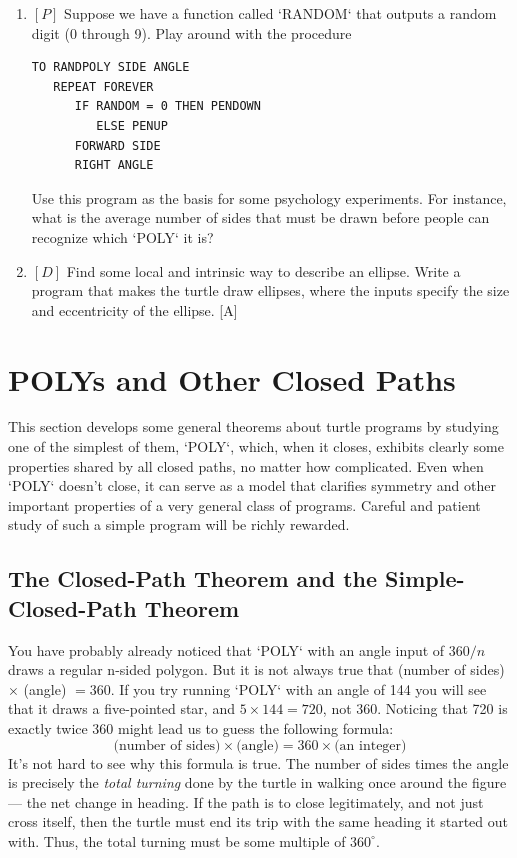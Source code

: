 \documentclass{book}
\begin{document}
\begin{enumerate}
\item $[P]$ Suppose we have a function called \textsc{`RANDOM`} that outputs a random
digit (0 through 9). Play around with the procedure

\begin{verbatim}
TO RANDPOLY SIDE ANGLE
   REPEAT FOREVER
      IF RANDOM = 0 THEN PENDOWN
         ELSE PENUP
      FORWARD SIDE
      RIGHT ANGLE
\end{verbatim}
Use this program as the basis for some psychology experiments. For
instance, what is the average number of sides that must be drawn before
people can recognize which \textsc{`POLY`} it is?
\item $[D]$ Find some local and intrinsic way to describe an ellipse. Write
a program that makes the turtle draw ellipses, where the inputs specify
the size and eccentricity of the ellipse. [A]
\end{enumerate}


\section{POLYs and Other Closed Paths}

This section develops some general theorems about turtle programs by
studying one of the simplest of them, \textsc{`POLY`}, which, when it closes,
exhibits clearly some properties shared by all closed paths, no matter
how complicated. Even when \textsc{`POLY`} doesn't close, it can serve as a model
that clarifies symmetry and other important properties of a very general
class of programs. Careful and patient study of such a simple program
will be richly rewarded.

\subsection{The Closed-Path Theorem and the Simple-Closed-Path Theorem}

You have probably already noticed that \textsc{`POLY`} with an angle input of
$360 / n$ draws a regular n-sided polygon. But it is not always true that
(number of sides) $\times$ (angle) $= 360$. If you try running \textsc{`POLY`} with an angle
of 144 you will see that it draws a five-pointed star, and $5 \times 144 = 720$,
not 360. Noticing that 720 is exactly twice 360 might lead us to guess
the following formula:
$$\text{(number of sides)} \times \text{(angle)} = 360 \times \text{(an integer)}$$
It's not hard to see why this formula is true. The number of sides
times the angle is precisely the {\em total turning} done by the turtle in
walking once around the figure --- the net change in heading. If the
path is to close legitimately, and not just cross itself, then the turtle
must end its trip with the same heading it started out with. Thus,
the total turning must be some multiple of $360^{\circ}$.
\end{document}
